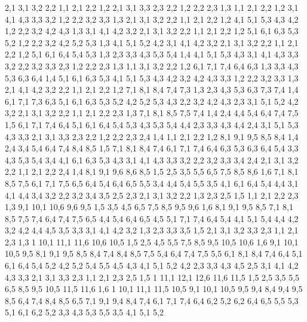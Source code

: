 2,1
3,1
3,2
2,2
%
1,1
2,1
2,2
1,2
2,1
3,1
3,3
2,3
2,2
%
1,2
2,2
2,3
1,3
%
1,1
2,1
2,2
1,2
3,1
4,1
4,3
3,3
3,2
%
1,2
2,2
3,2
3,3
1,3
%
2,1
3,1
3,2
2,2
%
1,1
2,1
2,2
1,2
4,1
5,1
5,3
4,3
4,2
%
1,2
2,2
3,2
4,2
4,3
1,3
%
3,1
4,1
4,2
3,2
%
2,1
3,1
3,2
2,2
%
1,1
2,1
2,2
1,2
5,1
6,1
6,3
5,3
5,2
%
1,2
2,2
3,2
4,2
5,2
5,3
1,3
%
4,1
5,1
5,2
4,2
%
3,1
4,1
4,2
3,2
%
2,1
3,1
3,2
2,2
%
1,1
2,1
2,2
1,2
5,1
6,1
6,4
5,4
5,3
%
1,3
2,3
3,3
4,3
5,3
5,4
1,4
%
4,1
5,1
5,3
4,3
%
3,1
4,1
4,3
3,3
3,2
%
2,2
3,2
3,3
2,3
%
1,2
2,2
2,3
1,3
%
1,1
3,1
3,2
2,2
1,2
6,1
7,1
7,4
6,4
6,3
%
1,3
3,3
4,3
5,3
6,3
6,4
1,4
%
5,1
6,1
6,3
5,3
%
4,1
5,1
5,3
4,3
4,2
%
3,2
4,2
4,3
3,3
%
1,2
2,2
3,2
3,3
1,3
%
2,1
4,1
4,2
3,2
2,2
%
1,1
2,1
2,2
1,2
7,1
8,1
8,4
7,4
7,3
%
1,3
2,3
4,3
5,3
6,3
7,3
7,4
1,4
%
6,1
7,1
7,3
6,3
%
5,1
6,1
6,3
5,3
5,2
%
4,2
5,2
5,3
4,3
%
2,2
3,2
4,2
4,3
2,3
%
3,1
5,1
5,2
4,2
3,2
%
2,1
3,1
3,2
2,2
%
1,1
2,1
2,2
2,3
1,3
7,1
8,1
8,5
7,5
7,4
%
1,4
2,4
4,4
5,4
6,4
7,4
7,5
1,5
%
6,1
7,1
7,4
6,4
%
5,1
6,1
6,4
5,4
5,3
%
4,3
5,3
5,4
4,4
%
2,3
3,3
4,3
4,4
2,4
%
3,1
5,1
5,3
4,3
3,3
%
2,1
3,1
3,3
2,3
2,2
%
1,2
2,2
2,3
2,4
1,4
%
1,1
2,1
2,2
1,2
8,1
9,1
9,5
8,5
8,4
%
1,4
2,4
3,4
5,4
6,4
7,4
8,4
8,5
1,5
%
7,1
8,1
8,4
7,4
%
6,1
7,1
7,4
6,4
6,3
%
5,3
6,3
6,4
5,4
%
3,3
4,3
5,3
5,4
3,4
%
4,1
6,1
6,3
5,3
4,3
%
3,1
4,1
4,3
3,3
3,2
%
2,2
3,2
3,3
3,4
2,4
%
2,1
3,1
3,2
2,2
%
1,1
2,1
2,2
2,4
1,4
8,1
9,1
9,6
8,6
8,5
%
1,5
2,5
3,5
5,5
6,5
7,5
8,5
8,6
1,6
%
7,1
8,1
8,5
7,5
%
6,1
7,1
7,5
6,5
6,4
%
5,4
6,4
6,5
5,5
%
3,4
4,4
5,4
5,5
3,5
%
4,1
6,1
6,4
5,4
4,4
%
3,1
4,1
4,4
3,4
3,2
%
2,2
3,2
3,4
3,5
2,5
2,3
%
2,1
3,1
3,2
2,2
%
1,3
2,3
2,5
1,5
%
1,1
2,1
2,2
2,3
1,3
9,1
10,1
10,6
9,6
9,5
%
1,5
3,5
4,5
6,5
7,5
8,5
9,5
9,6
1,6
%
8,1
9,1
9,5
8,5
%
7,1
8,1
8,5
7,5
7,4
%
6,4
7,4
7,5
6,5
%
4,4
5,4
6,4
6,5
4,5
%
5,1
7,1
7,4
6,4
5,4
%
4,1
5,1
5,4
4,4
4,2
%
3,2
4,2
4,4
4,5
3,5
3,3
%
3,1
4,1
4,2
3,2
%
1,3
2,3
3,3
3,5
1,5
%
2,1
3,1
3,2
3,3
2,3
%
1,1
2,1
2,3
1,3
1%
10,1
11,1
11,6
10,6
10,5
%
1,5
2,5
4,5
5,5
7,5
8,5
9,5
10,5
10,6
1,6
%
9,1
10,1
10,5
9,5
%
8,1
9,1
9,5
8,5
8,4
%
7,4
8,4
8,5
7,5
%
5,4
6,4
7,4
7,5
5,5
%
6,1
8,1
8,4
7,4
6,4
%
5,1
6,1
6,4
5,4
5,2
%
4,2
5,2
5,4
5,5
4,5
4,3
%
4,1
5,1
5,2
4,2
%
2,3
3,3
4,3
4,5
2,5
%
3,1
4,1
4,2
4,3
3,3
%
2,1
3,1
3,3
2,3
%
1,1
2,1
2,3
2,5
1,5
1%
11,1
12,1
12,6
11,6
11,5
%
1,5
2,5
3,5
5,5
6,5
8,5
9,5
10,5
11,5
11,6
1,6
1%
10,1
11,1
11,5
10,5
%
9,1
10,1
10,5
9,5
9,4
%
8,4
9,4
9,5
8,5
%
6,4
7,4
8,4
8,5
6,5
%
7,1
9,1
9,4
8,4
7,4
%
6,1
7,1
7,4
6,4
6,2
%
5,2
6,2
6,4
6,5
5,5
5,3
%
5,1
6,1
6,2
5,2
%
3,3
4,3
5,3
5,5
3,5
%
4,1
5,1
5,2
